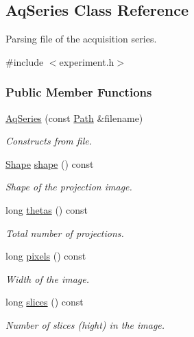 \hypertarget{classAqSeries}{
\subsection{AqSeries Class Reference}
\label{classAqSeries}
}


Parsing file of the acquisition series.  




{\ttfamily \#include $<$experiment.h$>$}

\subsubsection*{Public Member Functions}
\begin{DoxyCompactItemize}
\item 
\hyperlink{classAqSeries_a2ea7e194f8f01f12cfa01e21fa64ef5b}{AqSeries} (const \hyperlink{classPath}{Path} \&filename)
\begin{DoxyCompactList}\small\item\em Constructs from file. \item\end{DoxyCompactList}\item 
\hyperlink{group__Types_ga777964671cb4315ce8c56c920db031e3}{Shape} \hyperlink{classAqSeries_ad86806fdf232cf2c086df3c6173c5f2c}{shape} () const 
\begin{DoxyCompactList}\small\item\em Shape of the projection image. \item\end{DoxyCompactList}\item 
long \hyperlink{classAqSeries_a62f46e532ea4dd7c13b9aec9674e95f8}{thetas} () const 
\begin{DoxyCompactList}\small\item\em Total number of projections. \item\end{DoxyCompactList}\item 
long \hyperlink{classAqSeries_abcf7b3da848af25054634f38add23f71}{pixels} () const 
\begin{DoxyCompactList}\small\item\em Width of the image. \item\end{DoxyCompactList}\item 
long \hyperlink{classAqSeries_a90f5d3616cce96eb3c78f2d0ff812290}{slices} () const 
\begin{DoxyCompactList}\small\item\em Number of slices (hight) in the image. \item\end{DoxyCompactList}\item 

\end{DoxyCompactItemize}
